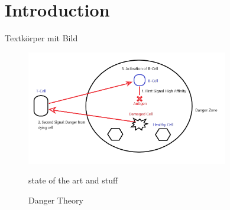 %
%
% 
% 
% 


\chapter{Introduction}
\label{chap:intro}

Textkörper mit Bild

\begin{figure}[htbp]
	\centering
		\includegraphics[height=5cm]{images/DT}
	\caption{Danger Theory}
	\label{fig:buecher}
	state of the art and stuff
\end{figure}



